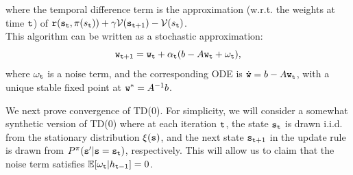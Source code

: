 \begin{enumerate}
where the temporal difference term is the approximation (w.r.t. the weights at time ${\tt t}$) of ${\tt r}({\tt s}_{\tt t},\pi(s_{\tt t})) +\gamma \mathcal{V}({\tt s}_{{\tt t}+1}) - \mathcal{V}(s_{\tt t})$.
\\
This algorithm can be written as a stochastic approximation:
\begin{equation*}
    {\tt w}_{{\tt t}+1} = {\tt w}_{\tt t} + \alpha_{\tt t} ( b -  A {\tt w}_{\tt t} + \omega_{\tt t} ),
\end{equation*}
where $\omega_{\tt t}$ is a noise term, and the corresponding ODE is $\dot{{\tt w}} = b -  A {\tt w}_{\tt t}$, with a unique stable fixed point at ${\tt w}^* = A^{-1}b$. 

We next prove convergence of TD(0). For simplicity, we will consider a somewhat synthetic version of TD(0) where at each iteration ${\tt t}$, the state ${\tt s}_{\tt t}$ is drawn i.i.d. from the stationary distribution $\xi({\tt s})$, and the next state ${\tt s}_{{\tt t}+1}$ in the update rule is drawn from $P^\pi({\tt s}'|{\tt s} = {\tt s}_{\tt t})$, respectively. This will allow us to claim that the noise term satisfies $\mathbb{E}[\omega_{\tt t}|h_{{\tt t}-1}]=0$. 



\end{enumerate}
